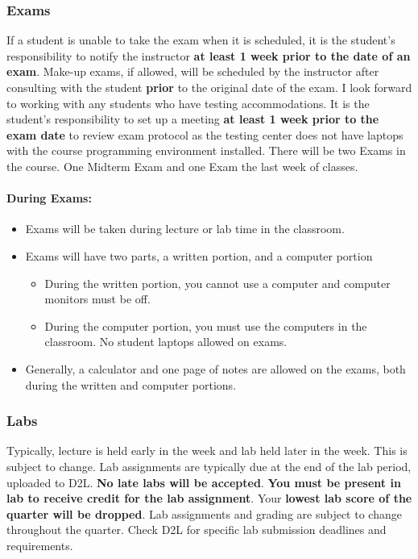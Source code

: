 \documentclass[11pt]{article}
\providecommand{\tightlist}{%
      \setlength{\itemsep}{0pt}\setlength{\parskip}{0pt}}
\begin{document}
    \hypertarget{exams}{%
\subsubsection{Exams}\label{exams}}

If a student is unable to take the exam when it is scheduled, it is the
student's responsibility to notify the instructor \textbf{at least 1
week prior to the date of an exam}. Make-up exams, if allowed, will be
scheduled by the instructor after consulting with the student
\textbf{prior} to the original date of the exam. I look forward to
working with any students who have testing accommodations. It is the
student's responsibility to set up a meeting \textbf{at least 1 week
prior to the exam date} to review exam protocol as the testing center
does not have laptops with the course programming environment installed.
There will be two Exams in the course. One Midterm Exam and one Exam the
last week of classes.

\hypertarget{during-exams}{%
\paragraph{During Exams:}\label{during-exams}}

\begin{itemize}
\tightlist
\item
  Exams will be taken during lecture or lab time in the classroom.
\item
  Exams will have two parts, a written portion, and a computer portion

  \begin{itemize}
  \tightlist
  \item
    During the written portion, you cannot use a computer and computer
    monitors must be off.
  \item
    During the computer portion, you must use the computers in the
    classroom. No student laptops allowed on exams.
  \end{itemize}
\item
  Generally, a calculator and one page of notes are allowed on the
  exams, both during the written and computer portions.
\end{itemize}

    \hypertarget{labs}{%
\subsubsection{Labs}\label{labs}}

Typically, lecture is held early in the week and lab held later in the
week. This is subject to change. Lab assignments are typically due at
the end of the lab period, uploaded to D2L. \textbf{No late labs will be
accepted}. \textbf{You must be present in lab to receive credit for the
lab assignment}. Your \textbf{lowest lab score of the quarter will be
dropped}. Lab assignments and grading are subject to change throughout
the quarter. Check D2L for specific lab submission deadlines and
requirements.
\end{document}
